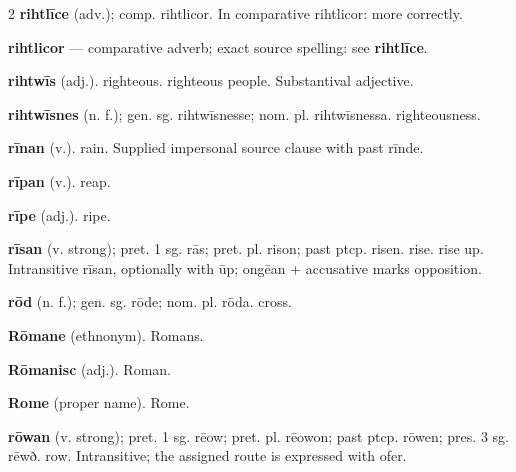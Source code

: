 \begin{multicols*}{2}
\textbf{rihtlīce} (adv.); comp. rihtlicor. In comparative rihtlicor: more correctly.\par
\textbf{rihtlicor} — comparative adverb; exact source spelling: see \textbf{rihtlīce}.\par
\textbf{rihtwīs} (adj.). righteous. righteous people. Substantival adjective.\par
\textbf{rihtwīsnes} (n. f.); gen. sg. rihtwīsnesse; nom. pl. rihtwīsnessa. righteousness.\par
\textbf{rīnan} (v.). rain. Supplied impersonal source clause with past rīnde.\par
\textbf{rīpan} (v.). reap.\par
\textbf{rīpe} (adj.). ripe.\par
\textbf{rīsan} (v. strong); pret. 1 sg. rās; pret. pl. rison; past ptcp. risen. rise. rise up. Intransitive rīsan, optionally with ūp; ongēan + accusative marks opposition.\par
\textbf{rōd} (n. f.); gen. sg. rōde; nom. pl. rōda. cross.\par
\textbf{Rōmane} (ethnonym). Romans.\par
\textbf{Rōmanisc} (adj.). Roman.\par
\textbf{Rome} (proper name). Rome.\par
\textbf{rōwan} (v. strong); pret. 1 sg. rēow; pret. pl. rēowon; past ptcp. rōwen; pres. 3 sg. rēwð. row. Intransitive; the assigned route is expressed with ofer.\par

\end{multicols*}
